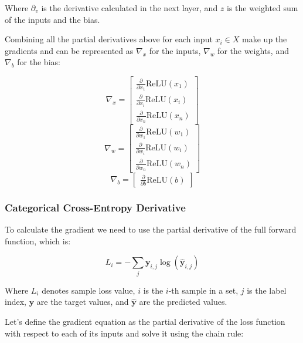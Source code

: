 \documentclass[a4paper]{article}
\newcommand{\vect}[1]{\bm{#1}}
\newcommand{\relu}{\text{ReLU}}
\begin{document}
Where $\partial_v$ is the derivative calculated in the next layer, and $z$ is the weighted sum of the inputs and the bias.

Combining all the partial derivatives above for each input $x_i \in X$ make up the gradients and can be represented as $\nabla_x$ for the inputs, $\nabla_w$ for the weights, and $\nabla_b$ for the bias:

\begin{equation*}
    \nabla_x = 
    \begin{bmatrix}
        \frac{\partial}{\partial x_1}\relu(x_1)\\
        \frac{\partial}{\partial x_i}\relu(x_i)\\
        \frac{\partial}{\partial x_n}\relu(x_n)
    \end{bmatrix}
\end{equation*}
\begin{equation*}
    \nabla_w = 
    \begin{bmatrix}
        \frac{\partial}{\partial w_1}\relu(w_1)\\
        \frac{\partial}{\partial w_i}\relu(w_i)\\
        \frac{\partial}{\partial w_n}\relu(w_n)
    \end{bmatrix}
\end{equation*}
\begin{equation*}
    \nabla_b = 
    \begin{bmatrix}
        \frac{\partial}{\partial b}\relu(b)
    \end{bmatrix}
\end{equation*}

\subsubsection*{Categorical Cross-Entropy Derivative}

To calculate the gradient we need to use the partial derivative of the full forward function, which is:

\begin{equation*}
    L_i = -\sum_{j} \vect{y}_{i,j} \log(\vect{\hat{y}}_{i,j})
\end{equation*}

Where $L_i$ denotes sample loss value, $i$ is the $i$-th sample in a set, $j$ is the label index, $\vect{y}$ are the target values, and $\vect{\hat{y}}$ are the predicted values.

Let's define the gradient equation as the partial derivative of the loss function with respect to each of its inputs and solve it using the chain rule:
\end{document}
